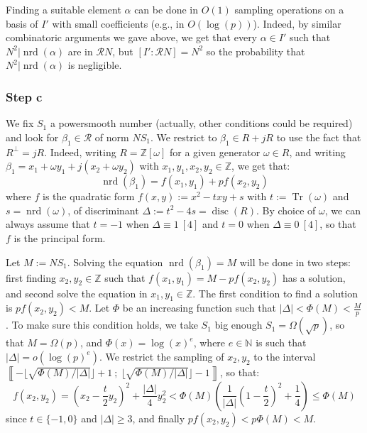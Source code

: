 \documentclass[a4paper,10pt]{report}
\theoremstyle{definition}
\theoremstyle{plain}
\theoremstyle{definition}
\newcommand{\N}{\mathbb{N}}
\newcommand{\Z}{\mathbb{Z}}
\newcommand{\m}[1]{\mathcal{#1}}
\renewcommand{\i}[2]{\left\llbracket #1~;~#2\right\rrbracket}
\renewcommand{\(}{\left(}
\renewcommand{\)}{\right)}
\DeclareMathOperator{\Tr}{Tr}
\DeclareMathOperator{\disc}{disc}
\DeclareMathOperator{\nrd}{nrd}
\begin{document}
Finding a suitable element $\alpha$ can be done in $O(1)$ sampling operations on a basis of $I'$ with small coefficients (e.g., in $O(\log(p))$).  Indeed, by similar combinatoric arguments we gave above, we get that every $\alpha\in I'$ such that $N^2|\nrd(\alpha)$ are in $\m{R}N$, but $[I':\m{R}N]=N^2$ so the probability that $N^2|\nrd(\alpha)$ is negligible.

\subsubsection{Step c}

We fix $S_1$ a powersmooth number (actually,  other conditions could be required) and look for $\beta_1\in\m{R}$ of norm $NS_1$. We restrict to $\beta_1\in R+jR$ to use the fact that $R^\bot=jR$.  Indeed, writing $R=\Z[\omega]$ for a given generator $\omega\in R$, and writing $\beta_1=x_1+\omega y_1+j(x_2+\omega y_2)$ with $x_1, y_1, x_2, y_2\in\Z$, we get that:
\[\nrd(\beta_1)=f(x_1,y_1)+pf(x_2,y_2)\]
where $f$ is the quadratic form $f(x,y):=x^2-t xy+s$ with $t:=\Tr(\omega)$ and $s=\nrd(\omega)$, of discriminant $\Delta:=t^2-4s=\disc(R)$.  By choice of $\omega$, we can always assume that $t=-1$ when $\Delta\equiv 1 \ [4]$ and $t=0$ when $\Delta\equiv 0 \ [4]$, so that $f$ is the principal form.  

Let $M:=NS_1$. Solving the equation $\nrd(\beta_1)=M$ will be done in two steps: first finding $x_2,y_2\in\Z$ such that $f(x_1,y_1)=M-pf(x_2,y_2)$ has a solution, and second solve the equation in $x_1,y_1\in\Z$.  The first condition to find a solution is $pf(x_2,y_2)<M$. Let $\Phi$ be an increasing function such that $|\Delta|<\Phi(M)<\frac{M}{p}$. To make sure this condition holds, we take $S_1$ big enough $S_1=\Omega(\sqrt{p})$, so that $M=\Omega(p)$, and $\Phi(x)=\log(x)^e$, where $e\in\N$ is such that $|\Delta|=o(\log(p)^e)$.  We restrict the sampling of $x_2, y_2$ to the interval $\i{-\lfloor\sqrt{\Phi(M)/|\Delta|}\rfloor+1}{\lfloor\sqrt{\Phi(M)/|\Delta|}\rfloor-1}$, so that:
\[f(x_2,y_2)=\(x_2-\frac{t}{2}y_2\)^2+\frac{|\Delta|}{4}y_2^2<\Phi(M)\(\frac{1}{|\Delta|}\(1-\frac{t}{2}\)^2+\frac{1}{4}\)\leq \Phi(M)\]
since $t\in\{-1,0\}$ and $|\Delta|\geq 3$, and finally $pf(x_2,y_2)<p\Phi(M)<M$. 
\end{document}
